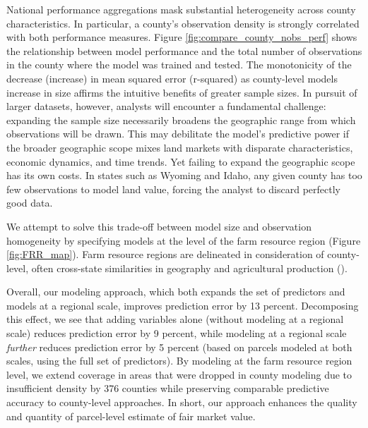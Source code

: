 \documentclass[12pt]{article}
\begin{document}
National performance aggregations mask substantial heterogeneity across county characteristics. In particular, a county's observation density is strongly correlated with both performance measures. Figure \ref{fig:compare_county_nobs_perf} shows the relationship between model performance and the total number of observations in the county where the model was trained and tested. The monotonicity of the decrease (increase) in mean squared error (r-squared) as county-level models increase in size affirms the intuitive benefits of greater sample sizes. In pursuit of larger datasets, however, analysts will encounter a fundamental challenge: expanding the sample size necessarily broadens the geographic range from which observations will be drawn. This may debilitate the model's predictive power if the broader geographic scope mixes land markets with disparate characteristics, economic dynamics, and time trends. Yet failing to expand the geographic scope has its own costs. In states such as Wyoming and Idaho, any given county has too few observations to model land value, forcing the analyst to discard perfectly good data.

We attempt to solve this trade-off between model size and observation homogeneity by specifying models at the level of the farm resource region (Figure \ref{fig:FRR_map}). Farm resource regions  are delineated in consideration of county-level, often cross-state similarities in geography and agricultural production (\cite{FRR2000}).

Overall, our modeling approach, which both expands the set of predictors and models at a regional scale, improves prediction error by 13 percent. Decomposing this effect, we see that adding variables alone (without modeling at a regional scale) reduces prediction error by 9 percent, while modeling at a regional scale \textit{further} reduces prediction error by 5 percent (based on parcels modeled at both scales, using the full set of predictors). By modeling at the farm resource region level, we extend coverage in areas that were dropped in county modeling due to insufficient density by 376 counties while preserving comparable predictive accuracy to county-level approaches. In short, our approach enhances the quality and quantity of parcel-level estimate of fair market value. 
\end{document}
